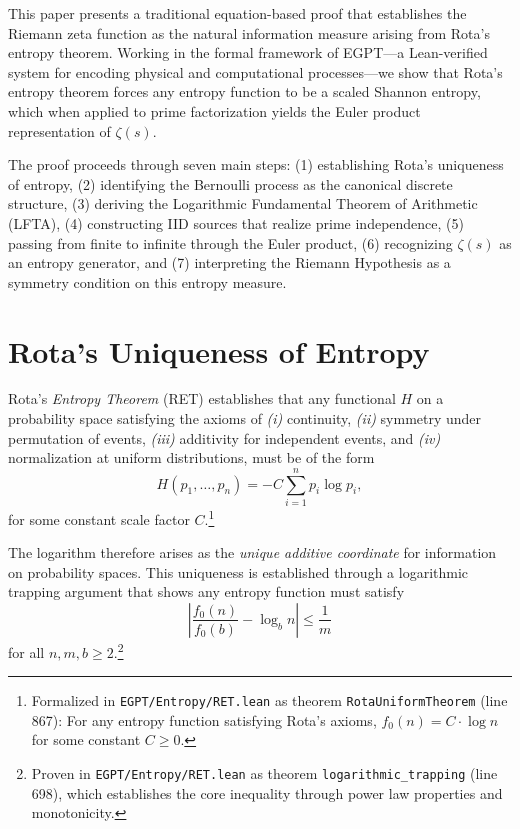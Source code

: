 \documentclass[12pt]{article}
\begin{document}
This paper presents a traditional equation-based proof that establishes the Riemann zeta function as the natural information measure arising from Rota's entropy theorem. Working in the formal framework of EGPT—a Lean-verified system for encoding physical and computational processes—we show that Rota's entropy theorem forces any entropy function to be a scaled Shannon entropy, which when applied to prime factorization yields the Euler product representation of $\zeta(s)$.

The proof proceeds through seven main steps: (1) establishing Rota's uniqueness of entropy, (2) identifying the Bernoulli process as the canonical discrete structure, (3) deriving the Logarithmic Fundamental Theorem of Arithmetic (LFTA), (4) constructing IID sources that realize prime independence, (5) passing from finite to infinite through the Euler product, (6) recognizing $\zeta(s)$ as an entropy generator, and (7) interpreting the Riemann Hypothesis as a symmetry condition on this entropy measure.

\section{Rota's Uniqueness of Entropy}

Rota's \emph{Entropy Theorem} (RET) establishes that any functional $H$ on a probability space satisfying the axioms of
\emph{(i)} continuity,
\emph{(ii)} symmetry under permutation of events,
\emph{(iii)} additivity for independent events, and
\emph{(iv)} normalization at uniform distributions,
must be of the form
\begin{equation}
H(p_1,\dots,p_n) = -C \sum_{i=1}^n p_i \log p_i,
\end{equation}
for some constant scale factor $C$.\footnote{Formalized in \texttt{EGPT/Entropy/RET.lean} as theorem \texttt{RotaUniformTheorem} (line 867): For any entropy function satisfying Rota's axioms, $f_0(n) = C \cdot \log n$ for some constant $C \geq 0$.}

The logarithm therefore arises as the \emph{unique additive coordinate} for information on probability spaces. This uniqueness is established through a logarithmic trapping argument that shows any entropy function must satisfy
\begin{equation}
\left|\frac{f_0(n)}{f_0(b)} - \log_b n\right| \leq \frac{1}{m}
\end{equation}
for all $n, m, b \geq 2$.\footnote{Proven in \texttt{EGPT/Entropy/RET.lean} as theorem \texttt{logarithmic\_trapping} (line 698), which establishes the core inequality through power law properties and monotonicity.}
\end{document}
